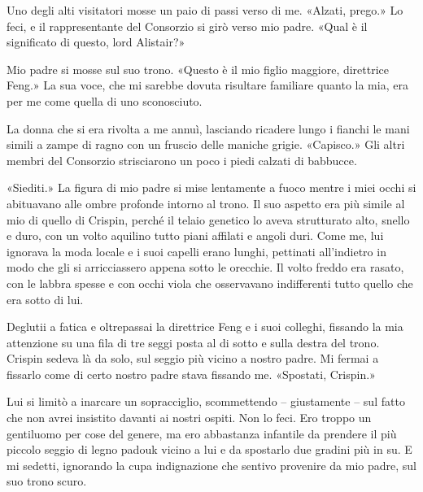 Uno degli alti visitatori mosse un paio di passi verso di me. «Alzati,
prego.» Lo feci, e il rappresentante del Consorzio si girò verso mio
padre. «Qual è il significato di questo, lord Alistair?»

Mio padre si mosse sul suo trono. «Questo è il mio figlio maggiore,
direttrice Feng.» La sua voce, che mi sarebbe dovuta risultare familiare
quanto la mia, era per me come quella di uno sconosciuto.

La donna che si era rivolta a me annuì, lasciando ricadere lungo i
fianchi le mani simili a zampe di ragno con un fruscio delle maniche
grigie. «Capisco.» Gli altri membri del Consorzio strisciarono un poco i
piedi calzati di babbucce.

«Siediti.» La figura di mio padre si mise lentamente a fuoco mentre i
miei occhi si abituavano alle ombre profonde intorno al trono. Il suo
aspetto era più simile al mio di quello di Crispin, perché il telaio
genetico lo aveva strutturato alto, snello e duro, con un volto aquilino
tutto piani affilati e angoli duri. Come me, lui ignorava la moda locale
e i suoi capelli erano lunghi, pettinati all'indietro in modo che gli si
arricciassero appena sotto le orecchie. Il volto freddo era rasato, con
le labbra spesse e con occhi viola che osservavano indifferenti tutto
quello che era sotto di lui.

Deglutii a fatica e oltrepassai la direttrice Feng e i suoi colleghi,
fissando la mia attenzione su una fila di tre seggi posta al di sotto e
sulla destra del trono. Crispin sedeva là da solo, sul seggio più vicino
a nostro padre. Mi fermai a fissarlo come di certo nostro padre stava
fissando me. «Spostati, Crispin.»

Lui si limitò a inarcare un sopracciglio, scommettendo -- giustamente --
sul fatto che non avrei insistito davanti ai nostri ospiti. Non lo feci.
Ero troppo un gentiluomo per cose del genere, ma ero abbastanza
infantile da prendere il più piccolo seggio di legno padouk vicino a lui
e da spostarlo due gradini più in su. E mi sedetti, ignorando la cupa
indignazione che sentivo provenire da mio padre, sul suo trono scuro.